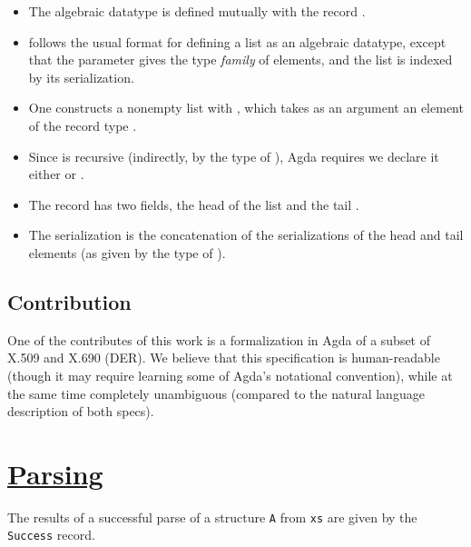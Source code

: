 \documentclass[11pt]{article}
\begin{document}
\begin{itemize}
\item The algebraic datatype  is defined mutually with
the record .

\item {} follows the usual format for defining a list as an
algebraic datatype, except that the parameter  gives the type
\emph{family} of elements, and the list is indexed by its serialization.

\item One constructs a nonempty list with , which
takes as an argument an element of the record type
.

\item Since  is recursive (indirectly, by the type
of ), Agda requires we declare it either
 or .

\item The record has two fields, the head of the list  and the tail
.

\item The serialization is the concatenation of the serializations of the head
and tail elements (as given by the type of ).
\end{itemize}

\subsection{Contribution}
\label{sec:orge125a2c}

One of the contributes of this work is a formalization in Agda of a subset
of X.509 and X.690 (DER).
We believe that this specification is human-readable (though it may require
learning some of Agda's notational convention), while at the same time
completely unambiguous (compared to the natural language description of both
specs).

\section{\href{../src/Aeres/Grammar/Parser/Core.agda}{Parsing}}
\label{sec:org36b183f}

The results of a successful parse of a structure \texttt{A} from \texttt{xs} are given by
the \texttt{Success} record.
\end{document}
